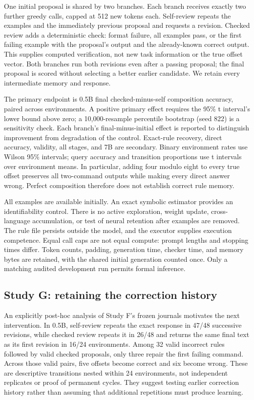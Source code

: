 \documentclass[11pt]{article}
\begin{document}
One initial proposal is shared by two branches. Each branch receives exactly
two further greedy calls, capped at 512 new tokens each. Self-review repeats
the examples and the immediately previous proposal and requests a revision.
Checked review adds a deterministic check: format failure, all examples pass,
or the first failing example with the proposal's output and the already-known
correct output. This supplies computed verification, not new task information
or the true offset vector. Both branches run both revisions even after a
passing proposal; the final proposal is scored without selecting a better
earlier candidate. We retain every intermediate memory and response.

The primary endpoint is 0.5B final checked-minus-self composition accuracy,
paired across environments. A positive primary effect requires the 95\% t
interval's lower bound above zero; a 10,000-resample percentile bootstrap
(seed 822) is a sensitivity check. Each branch's final-minus-initial effect
is reported to distinguish improvement from degradation of the control.
Exact-rule recovery, direct accuracy, validity, all stages, and 7B are
secondary. Binary environment rates use Wilson 95\% intervals; query accuracy
and transition proportions use t intervals over environment means. In
particular, adding four modulo eight to every true offset
preserves all two-command outputs while making every direct answer wrong.
Perfect composition therefore does not establish correct rule memory.

All examples are available initially. An exact symbolic estimator provides
an identifiability control. There is no active exploration, weight update,
cross-language accumulation, or test of neural retention after examples are
removed. The rule file persists outside the model, and the executor supplies
execution competence. Equal call caps are not equal compute: prompt lengths
and stopping times differ. Token counts, padding, generation time, checker
time, and memory bytes are retained, with the shared initial generation
counted once. Only a matching audited development run permits formal inference.

\subsection{Study G: retaining the correction history}
An explicitly post-hoc analysis of Study F's frozen journals motivates the
next intervention. In 0.5B, self-review repeats the exact response in 47/48
successive revisions, while checked review repeats it in 26/48 and returns
the same final text as its first revision in 16/24 environments. Among 32
valid incorrect rules followed by valid checked proposals, only three repair
the first failing command. Across those valid pairs, five offsets become
correct and six become wrong. These are descriptive transitions nested within
24 environments, not independent replicates or proof of permanent cycles.
They suggest testing earlier correction history rather than assuming that
additional repetitions must produce learning.
\end{document}
